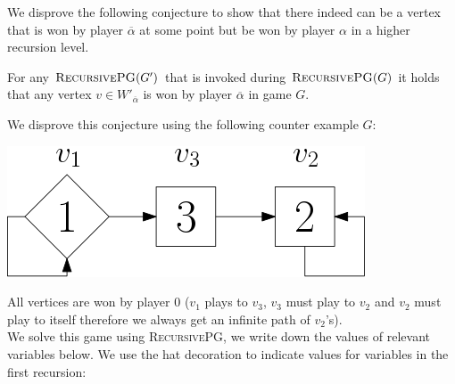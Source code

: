 We disprove the following conjecture to show that there indeed can be a vertex that is won by player $\overline{\alpha}$ at some point but be won by player $\alpha$ in a higher recursion level.
\begin{conjecture}
	For any $\textsc{RecursivePG}(G')$ that is invoked during $\textsc{RecursivePG}(G)$ it holds that any vertex $v \in W'_{\overline{\alpha}}$ is won by player $\overline{\alpha}$ in game $G$.
\end{conjecture}
We disprove this conjecture using the following counter example $G$:\\
\begin{center}
	\includegraphics[scale=0.5]{counterexampleBconjecture}\\
\end{center}
All vertices are won by player $0$ ($v_1$ plays to $v_3$, $v_3$ must play to $v_2$ and $v_2$ must play to itself therefore we always get an infinite path of $v_2$'s).\\
We solve this game using \textsc{RecursivePG}, we write down the values of relevant variables below. We use the hat decoration to indicate values for variables in the first recursion:\\
